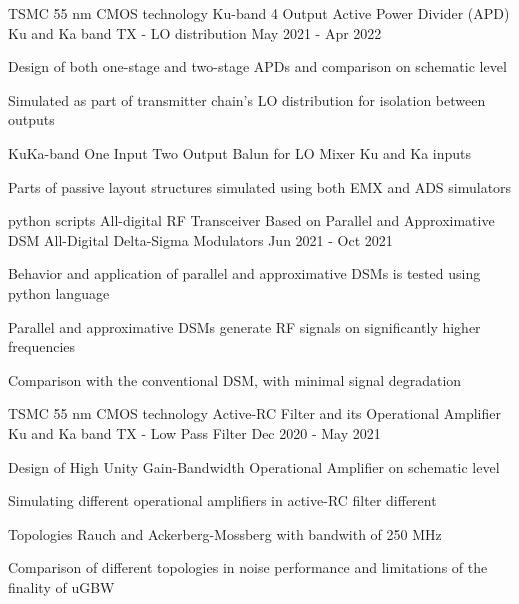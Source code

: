 \begin{cventries}

\cventry
{TSMC 55 nm CMOS technology} %
{Ku-band 4 Output Active Power Divider (APD)} %
{Ku and Ka band TX - LO distribution} %
{May 2021 - Apr 2022} %
{ %
\begin{cvitems}
    \item {Design of both one-stage and two-stage APDs and comparison on schematic level}
    \item {Simulated as part of transmitter chain's LO distribution for isolation between outputs}
    \item {KuKa-band One Input Two Output Balun for LO Mixer Ku and Ka inputs}
    \item {Parts of passive layout structures simulated using both EMX and ADS simulators}
\end{cvitems}
}


\cventry
{python scripts} %
{All-digital RF Transceiver Based on Parallel and Approximative DSM} %
{All-Digital Delta-Sigma Modulators} %
{Jun 2021 - Oct 2021} %
{ %
\begin{cvitems}
    \item {Behavior and application of parallel and approximative DSMs is tested using python language}
    \item {Parallel and approximative DSMs generate RF signals on significantly higher frequencies }
    \item {Comparison with the conventional DSM, with minimal signal degradation}
\end{cvitems}
}


\cventry
{TSMC 55 nm CMOS technology} %
{Active-RC Filter and its Operational Amplifier} %
{Ku and Ka band TX - Low Pass Filter} %
{Dec 2020 - May 2021} %
{ %
\begin{cvitems}
    \item {Design of High Unity Gain-Bandwidth Operational Amplifier on schematic level}
    \item {Simulating different operational amplifiers in active-RC filter different}
    \item {Topologies Rauch and Ackerberg-Mossberg with bandwith of 250 MHz}
    \item {Comparison of different topologies in noise performance and limitations of the finality of uGBW}
\end{cvitems} 
}


\end{cventries}

